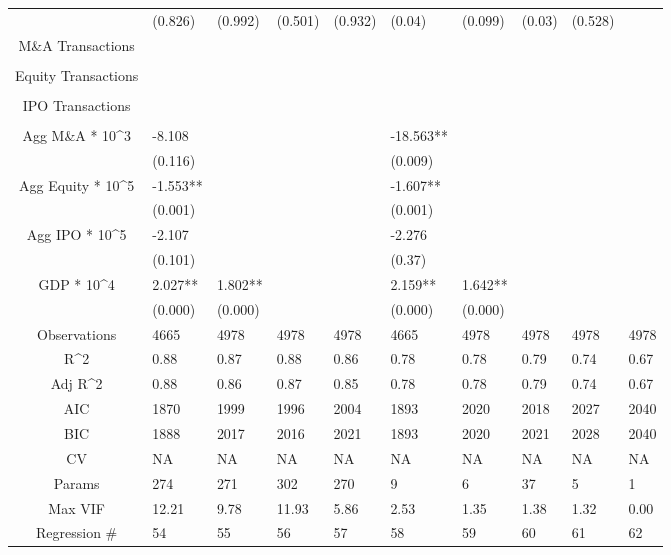\documentclass{article}
\begin{document}
\begin{table}[H]
\begin{tabular}{|clllllllll|}
   & (0.826) & (0.992) & (0.501) & (0.932) & (0.04) & (0.099) & (0.03) & (0.528) &  \\
  M\&A Transactions &  &  &  &  &  &  &  &  &  \\
   &  &  &  &  &  &  &  &  &  \\
  Equity Transactions &  &  &  &  &  &  &  &  &  \\
   &  &  &  &  &  &  &  &  &  \\
  IPO Transactions &  &  &  &  &  &  &  &  &  \\
   &  &  &  &  &  &  &  &  &  \\
  Agg M\&A * 10^3 & -8.108 &  &  &  & -18.563** &  &  &  &  \\
   & (0.116) &  &  &  & (0.009) &  &  &  &  \\
  Agg Equity * 10^5 & -1.553** &  &  &  & -1.607** &  &  &  &  \\
   & (0.001) &  &  &  & (0.001) &  &  &  &  \\
  Agg IPO * 10^5 & -2.107 &  &  &  & -2.276 &  &  &  &  \\
   & (0.101) &  &  &  & (0.37) &  &  &  &  \\
  GDP * 10^4 & 2.027** & 1.802** &  &  & 2.159** & 1.642** &  &  &  \\
   & (0.000) & (0.000) &  &  & (0.000) & (0.000) &  &  &  \\
  \hline
 Observations & 4665 & 4978 & 4978 & 4978 & 4665 & 4978 & 4978 & 4978 & 4978 \\
  R^2 & 0.88 & 0.87 & 0.88 & 0.86 & 0.78 & 0.78 & 0.79 & 0.74 & 0.67 \\
  Adj R^2 & 0.88 & 0.86 & 0.87 & 0.85 & 0.78 & 0.78 & 0.79 & 0.74 & 0.67 \\
  AIC & 1870 & 1999 & 1996 & 2004 & 1893 & 2020 & 2018 & 2027 & 2040 \\
  BIC & 1888 & 2017 & 2016 & 2021 & 1893 & 2020 & 2021 & 2028 & 2040 \\
  CV & NA & NA & NA & NA & NA & NA & NA & NA & NA \\
  Params & 274 & 271 & 302 & 270 & 9 & 6 & 37 & 5 & 1 \\
  Max VIF & 12.21 & 9.78 & 11.93 & 5.86 & 2.53 & 1.35 & 1.38 & 1.32 & 0.00 \\
  Regression \# & 54 & 55 & 56 & 57 & 58 & 59 & 60 & 61 & 62 \\
   \hline
\end{tabular}

\end{table}
\end{document}
